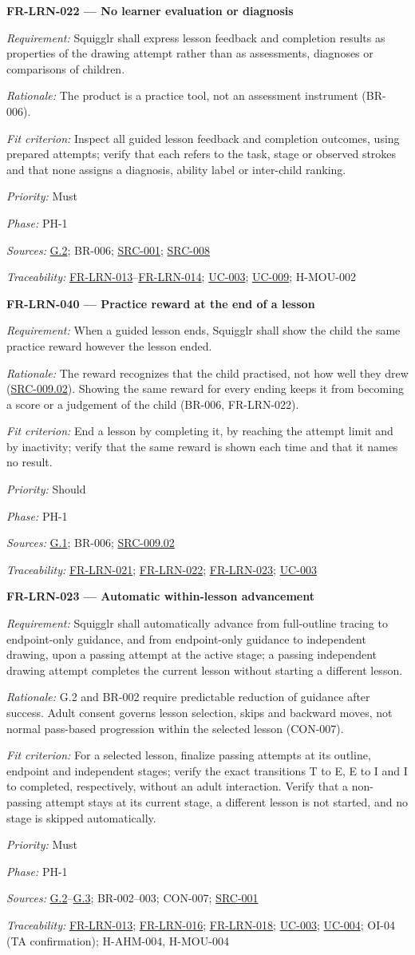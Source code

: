 \documentclass[12pt]{article}
\renewcommand{\_}{\textunderscore\allowbreak}%
\newcommand{\goalref}[1]{\hyperref[goal:#1]{G.#1}}
\newcommand{\ucref}[1]{\hyperref[uc:#1]{\mbox{UC-#1}}}
\newenvironment{srsrequirement}[2]{%
  \par\medskip\noindent\phantomsection\label{req:#1}%
  \textbf{#1 --- #2}\par\nobreak\smallskip }{\par\medskip}
\newcommand{\reqfield}[2]{\noindent\textit{#1:} #2\par}
\newcommand{\reqshall}[1]{\reqfield{Requirement}{#1}}
\newcommand{\reqrationale}[1]{\reqfield{Rationale}{#1}}
\newcommand{\reqfit}[1]{\reqfield{Fit criterion}{#1}}
\newcommand{\reqpriority}[1]{\reqfield{Priority}{#1}}
\newcommand{\reqphase}[1]{\reqfield{Phase}{#1}}
\newcommand{\reqsources}[1]{\reqfield{Sources}{#1}}
\newcommand{\reqtraces}[1]{\reqfield{Traceability}{#1}}
\newcommand{\reqref}[1]{\hyperref[req:#1]{#1}}
\newcommand{\srcref}[1]{\hyperref[src:#1]{SRC-#1}}
\providecommand{\ucref}[1]{\hyperref[uc:#1]{UC-#1}}
\begin{document}
\begin{srsrequirement}{FR-LRN-022}{No learner evaluation or diagnosis}
  \reqshall{Squigglr shall express lesson feedback and completion results as
properties of the drawing attempt rather than as assessments, diagnoses or
comparisons of children.}
  \reqrationale{The product is a practice tool, not an assessment instrument (BR-006).}
  \reqfit{Inspect all guided lesson feedback and completion outcomes, using
prepared attempts; verify that each refers to the task, stage or observed
strokes and that none assigns a diagnosis, ability label or inter-child
ranking.}
  \reqpriority{Must}
  \reqphase{PH-1}
  \reqsources{\goalref{2}; BR-006; \srcref{001}; \srcref{008}}
  \reqtraces{\reqref{FR-LRN-013}--\reqref{FR-LRN-014}; \ucref{003}; \ucref{009};
  H-MOU-002}
\end{srsrequirement}

\begin{srsrequirement}{FR-LRN-040}{Practice reward at the end of a lesson}
  \reqshall{When a guided lesson ends, Squigglr shall show the child the same
practice reward however the lesson ended.} \reqrationale{The reward recognizes
that the child practised, not how well they drew (\srcref{009.02}). Showing the
same reward for every ending keeps it from becoming a score or a judgement of
the child (BR-006, FR-LRN-022).} \reqfit{End a lesson by completing it, by
reaching the attempt limit and by inactivity; verify that the same reward is
shown each time and that it names no result.}
  \reqpriority{Should}
  \reqphase{PH-1}
  \reqsources{\goalref{1}; BR-006; \srcref{009.02}}
  \reqtraces{\reqref{FR-LRN-021}; \reqref{FR-LRN-022}; \reqref{FR-LRN-023};
  \ucref{003}}
\end{srsrequirement}

\begin{srsrequirement}{FR-LRN-023}{Automatic within-lesson advancement}
  \reqshall{Squigglr shall automatically advance from full-outline tracing to
endpoint-only guidance, and from endpoint-only guidance to independent drawing,
upon a passing attempt at the active stage; a passing independent drawing
attempt completes the current lesson without starting a different lesson.}
\reqrationale{G.2 and BR-002 require predictable reduction of guidance after
success. Adult consent governs lesson selection, skips and backward moves, not
normal pass-based progression within the selected lesson (CON-007).} \reqfit{For
a selected lesson, finalize passing attempts at its outline, endpoint and
independent stages; verify the exact transitions T to E, E to I and I to
completed, respectively, without an adult interaction. Verify that a non-passing
attempt stays at its current stage, a different lesson is not started, and no
stage is skipped automatically.}
  \reqpriority{Must}
  \reqphase{PH-1}
  \reqsources{\goalref{2}--\goalref{3}; BR-002--003; CON-007; \srcref{001}}
  \reqtraces{\reqref{FR-LRN-013}; \reqref{FR-LRN-016}; \reqref{FR-LRN-018};
  \ucref{003}; \ucref{004}; OI-04 (TA confirmation); H-AHM-004, H-MOU-004}
\end{srsrequirement}
\end{document}
